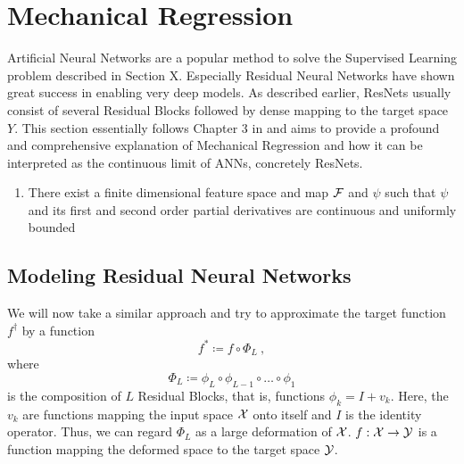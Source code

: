 \section{Mechanical Regression}

Artificial Neural Networks are a popular method to solve the Supervised Learning problem described in Section X.
Especially Residual Neural Networks have shown great success in enabling very deep models.
As described earlier, ResNets usually consist of several Residual Blocks followed by dense mapping to the target space $Y$.
This section essentially follows Chapter 3 in \cite{owhadi20} and aims to provide a profound and comprehensive explanation of Mechanical Regression and how it can be interpreted as the continuous limit of ANNs, concretely ResNets.

\begin{condition}
	\label{cond:feature-condition}
	\begin{enumerate}
		\item There exist a finite dimensional feature space and map $\mathcal{F}$ and $\psi$ such that $\psi$ and its first and second order partial derivatives are continuous and uniformly bounded
	\end{enumerate}
\end{condition}

\subsection{Modeling Residual Neural Networks}
We will now take a similar approach and try to approximate the target function $f^\dagger$ by a function
\begin{equation}
	f^\ast \coloneqq f \circ \Phi_L \ ,
\end{equation}
where 
\begin{equation}
	\Phi_L \coloneqq \phi_L \circ \phi_{L-1} \circ \ldots \circ \phi_1
\end{equation} 
is the composition of $L$ Residual Blocks, that is, functions $\phi_k = I + v_k$.
Here, the $v_k$ are functions mapping the input space $\mathcal{X}$ onto itself and $I$ is the identity operator.
Thus, we can regard $\Phi_L$ as a large deformation of $\mathcal{X}$.
$f: \mathcal{X} \to \mathcal{Y}$ is a function mapping the deformed space to the target space $\mathcal{Y}$.

